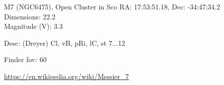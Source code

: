 \begin{block}{M7 (NGC6475), Open Cluster in Sco}
    RA: 17:53:51.18, Dec: -34:47:34.2 \\ 
    Dimensions: 22.2 \\ 
    Magnitude (V): 3.3


    Desc: (Dreyer) Cl, vB, pRi, lC, st 7...12 

    Finder fov: 60 

    \url{https://en.wikipedia.org/wiki/Messier_7} 
\end{block}